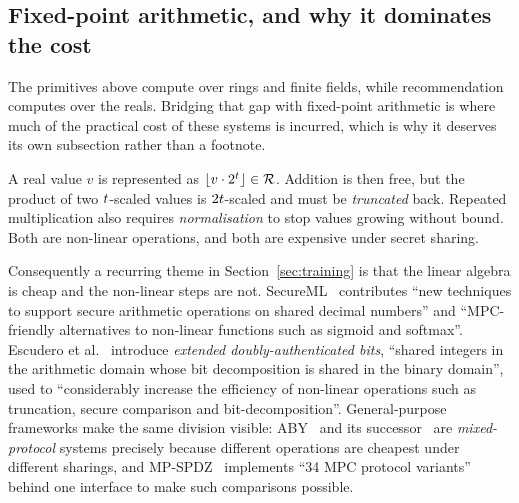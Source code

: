 \subsection{Fixed-point arithmetic, and why it dominates the cost}
\label{sec:prim:fixedpoint}

The primitives above compute over rings and finite fields, while recommendation computes over the reals.
Bridging that gap with fixed-point arithmetic is where much of the practical cost of these systems
is incurred, which is why it deserves its own subsection rather than a footnote.

A real value $v$ is represented as $\lfloor v \cdot 2^{t} \rfloor \in \mathcal{R}$. Addition is
then free, but the product of two $t$-scaled values is $2t$-scaled and must be
\emph{truncated} back. Repeated multiplication also requires \emph{normalisation} to stop values
growing without bound. Both are non-linear operations, and both are expensive under secret
sharing.

Consequently a recurring theme in Section~\ref{sec:training} is that the linear algebra is cheap
and the non-linear steps are not. SecureML~\cite{secureml2017} contributes ``new techniques to
support secure arithmetic operations on shared decimal numbers'' and ``MPC-friendly alternatives
to non-linear functions such as sigmoid and softmax''. Escudero et al.~\cite{escudero2020}
introduce \emph{extended doubly-authenticated bits}, ``shared integers in the arithmetic domain
whose bit decomposition is shared in the binary domain'', used to ``considerably increase the
efficiency of non-linear operations such as truncation, secure comparison and bit-decomposition''.
General-purpose frameworks make the same division visible: ABY~\cite{aby2015} and its
successor~\cite{aby22021} are \emph{mixed-protocol} systems precisely because different operations
are cheapest under different sharings, and MP-SPDZ~\cite{mpspdz2020} implements ``34 MPC protocol
variants'' behind one interface to make such comparisons possible.
